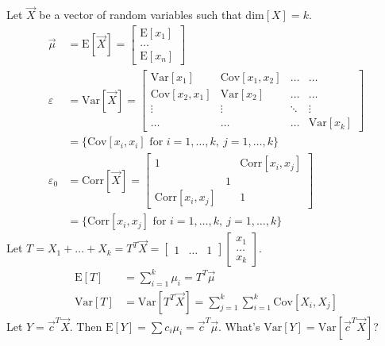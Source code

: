 \documentclass[12pt]{article}
\newcommand{\set}[1]{\Big\{ #1 \Big\}}
\newcommand{\expected}[1]{\mathrm{E}[#1]}
\newcommand{\variance}[1]{\mathrm{Var}[#1]}
\newcommand{\covariance}[1]{\mathrm{Cov}[#1]}
\begin{document}
Let $\vec{X}$ be a vector of random variables such that dim$[X] = k$. $$\begin{aligned} 
\vec{\mu} &= \expected{\vec{X}} = \begin{bmatrix} \expected{x_1} \\ \hdots \\ \expected{x_n} \end{bmatrix} \\ \varepsilon &= \variance{\vec{X}} = \begin{bmatrix} \variance{x_1} & \covariance{x_1, x_2} &  \ldots & \ldots \\ \covariance{x_2, x_1} & \variance{x_2} & \ldots & \ldots \\ \vdots & \vdots & \ddots & \vdots \\ \ldots & \ldots & \ldots & \variance{x_k} \end{bmatrix} \\ &= \set{\covariance{x_i, x_i} \text{ for } i = 1, \dots, k,~ j = 1, \dots, k} \\
\varepsilon_0 &= \text{Corr}[\vec{X}] = \begin{bmatrix}1 &  &\text{Corr}[x_i, x_j] \\  & 1 & \\ \text{Corr}[x_i, x_j] &  & 1 \end{bmatrix} \\ &= \set{\text{Corr}[x_i, x_j] \text{ for } i = 1, \dots, k,~ j = 1, \dots, k} \end{aligned} $$ 
Let $T = X_1 + \dots + X_k = T^T \vec{X} = \begin{bmatrix} 1 & \ldots & 1 \end{bmatrix}\begin{bmatrix} x_1 \\ \hdots \\ x_k \end{bmatrix}$. $$\begin{aligned} \expected{T} &= \sum_{i = 1}^k \mu_i = T^T\vec{\mu} \\ \variance{T} &= \variance{T^T\vec{X}} = \sum_{j = 1}^k \sum_{i = 1}^k \covariance{X_i, X_j} \end{aligned} $$ 
Let $Y = \vec{c}^T\vec{X}$. Then $\expected{Y} = \sum c_i \mu_i = \vec{c}^T \vec{\mu}$. What's $\variance{Y} = \variance{\vec{c}^T \vec{X}}$? \\
\end{document}
